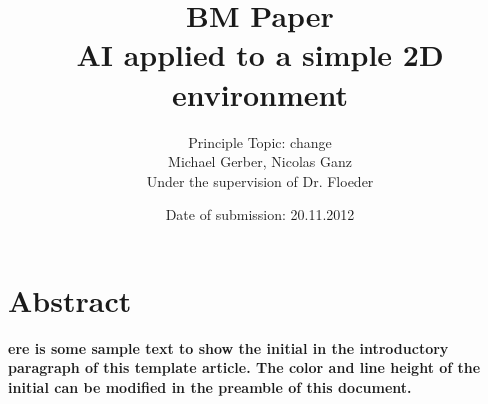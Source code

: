 %
%
%
%




\usepackage{glossaries} %
\makeglossaries





\begin{titlepage}
  \thispagestyle{empty}

  \title{
    BM Paper\bigskip\\
    \fontsize{20}{20}
    \selectfont
    AI applied to a simple 2D environment
  }
  \author{
    Principle Topic: change\bigskip\\
    Michael Gerber, Nicolas Ganz\\
    Under the supervision of Dr. Floeder
  }
  \date{Date of submission: 20.11.2012}

  \maketitle %
\end{titlepage}

\tableofcontents

\chapter{Abstract}
\textbf{ere is some sample text to show the initial in the introductory paragraph of this template article. The color and line height of the initial can be modified in the preamble of this document.}

